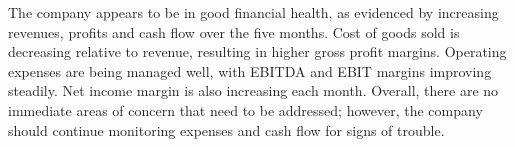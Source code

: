 

The company appears to be in good financial health, as evidenced by increasing revenues, profits and cash flow over the five months. Cost of goods sold is decreasing relative to revenue, resulting in higher gross profit margins. Operating expenses are being managed well, with EBITDA and EBIT margins improving steadily. Net income margin is also increasing each month. Overall, there are no immediate areas of concern that need to be addressed; however, the company should continue monitoring expenses and cash flow for signs of trouble.